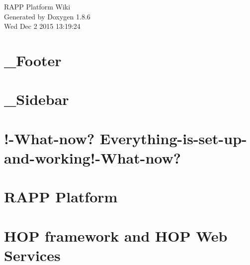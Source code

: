 \documentclass[twoside]{book}
\newcommand{\clearemptydoublepage}{%
  \newpage{\pagestyle{empty}\cleardoublepage}%
}
\begin{document}
\hypersetup{pageanchor=false}
\begin{titlepage}
\vspace*{7cm}
\begin{center}%
{\Large R\-A\-P\-P Platform Wiki }\\
\vspace*{1cm}
{\large Generated by Doxygen 1.8.6}\\
\vspace*{0.5cm}
{\small Wed Dec 2 2015 13:19:24}\\
\end{center}
\end{titlepage}
\clearemptydoublepage
\tableofcontents
\clearemptydoublepage
{}
\hypersetup{pageanchor=true}

\chapter{\-\_\-\-Footer}
\label{md_rapp-platform_8wiki__Footer}
\hypertarget{md_rapp-platform_8wiki__Footer}{}

\chapter{\-\_\-\-Sidebar}
\label{md_rapp-platform_8wiki__Sidebar}
\hypertarget{md_rapp-platform_8wiki__Sidebar}{}

\chapter{!-\/\-What-\/now? Everything-\/is-\/set-\/up-\/and-\/working!-\/\-What-\/now?}
\label{md_rapp-platform_8wiki_Everything-is-set-up-and-working}
\hypertarget{md_rapp-platform_8wiki_Everything-is-set-up-and-working}{}

\chapter{R\-A\-P\-P Platform}
\label{md_rapp-platform_8wiki_Home}
\hypertarget{md_rapp-platform_8wiki_Home}{}

\chapter{H\-O\-P framework and H\-O\-P Web Services}
\label{md_rapp-platform_8wiki_HOP-Services---General-Information}
\hypertarget{md_rapp-platform_8wiki_HOP-Services---General-Information}{}

\end{document}

